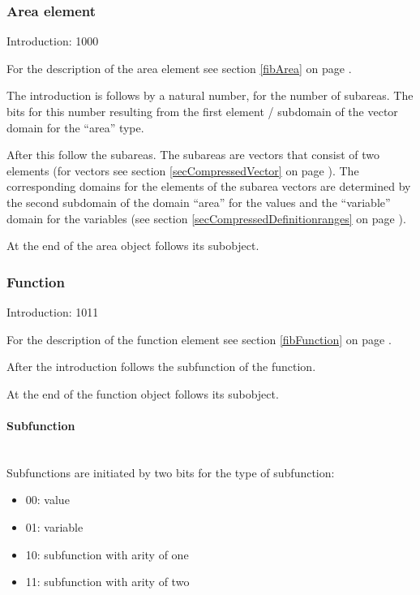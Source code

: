 \subsubsection{Area element}
\label{secCompressedArea}

Introduction: 1000

\bigskip\noindent
For the description of the area element see section \ref{fibArea} on page \pageref{fibArea} .

The introduction is follows by a natural number, for the number of subareas. The bits for this number resulting from the first element / subdomain of the vector domain for the ``area'' type.

After this follow the subareas.
The subareas are vectors that consist of two elements (for vectors see section \ref{secCompressedVector} on page \pageref{secCompressedVector}).
The corresponding domains for the elements of the subarea vectors are determined by the second subdomain of the domain ``area'' for the values and the ``variable'' domain  for the variables (see section \ref{secCompressedDefinitionranges} on page \pageref{secCompressedDefinitionranges}).

At the end of the area object follows its subobject.


\subsubsection{Function}
\label{secCompressedFunctions}

Introduction: 1011

\bigskip\noindent
For the description of the function element see section \ref{fibFunction} on page \pageref{fibFunction} .

After the introduction follows the subfunction of the function.

At the end of the function object follows its subobject.


\paragraph{Subfunction}
\label{secCompressedUnderFunction}

\ \\
Subfunctions are initiated by two bits for the type of subfunction:
\begin{itemize}
 \item 00: value
 \item 01: variable
 \item 10: subfunction with arity of one
 \item 11: subfunction with arity of two
\end{itemize}

